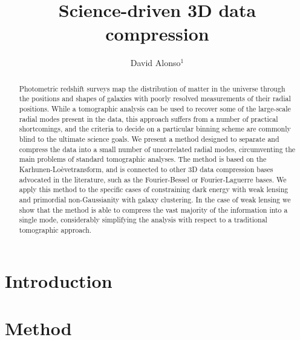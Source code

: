 \documentclass[twocolumn,amsfont,amssymb,amsmath, showpacs,balancelastpage, nofootinbib]{revtex4-1}
\newcommand{\kalo}{Karhunen-Lo\`{e}ve}
\begin{document}
\title{Science-driven 3D data compression}
\author{David Alonso$^1$}

\begin{abstract}
  Photometric redshift surveys map the distribution of matter in the universe through the positions and shapes of galaxies with poorly resolved measurements of their radial positions. While a tomographic analysis can be used to recover some of the large-scale radial modes present in the data, this approach suffers from a number of practical shortcomings, and the criteria to decide on a particular binning scheme are commonly blind to the ultimate science goals. We present a method designed to separate and compress the data into a small number of uncorrelated radial modes, circumventing the main problems of standard tomographic analyses. The method is based on the \kalo transform, and is connected to other 3D data compression bases advocated in the literature, such as the Fourier-Bessel or Fourier-Laguerre bases. We apply this method to the specific cases of constraining dark energy with weak lensing and primordial non-Gaussianity with galaxy clustering. In the case of weak lensing we show that the method is able to compress the vast majority of the information into a single mode, considerably simplifying the analysis with respect to a traditional tomographic approach. \lipsum[0]
\end{abstract}

\maketitle

\section{Introduction}\label{sec:intro}
\lipsum[1]

\section{Method}\label{sec:method}
\end{document}
